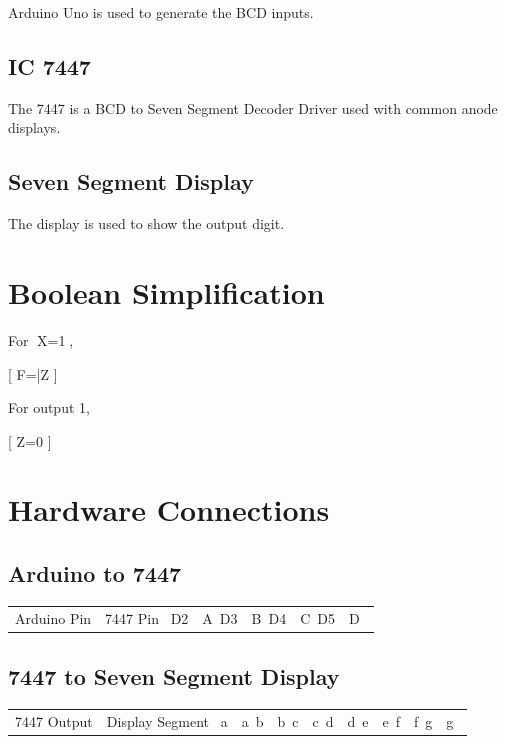 \documentclass[a4paper,12pt]{article}
\begin{document}
Arduino Uno is used to generate the BCD inputs.

\subsection{IC 7447}

The 7447 is a BCD to Seven Segment Decoder Driver used with common anode displays.

\subsection{Seven Segment Display}

The display is used to show the output digit.

\section{Boolean Simplification}

For X=1,

[
F=\bar{Z}
]

For output 1,

[
Z=0
]

\section{Hardware Connections}

\subsection{Arduino to 7447}

\begin{center}
\begin{tabular}{|c|c|}
\hline
Arduino Pin & 7447 Pin\
\hline
D2 & A\
D3 & B\
D4 & C\
D5 & D\
\hline
\end{tabular}
\end{center}

\subsection{7447 to Seven Segment Display}

\begin{center}
\begin{tabular}{|c|c|}
\hline
7447 Output & Display Segment\
\hline
a & a\
b & b\
c & c\
d & d\
e & e\
f & f\
g & g\
\hline
\end{tabular}
\end{center}
\end{document}
